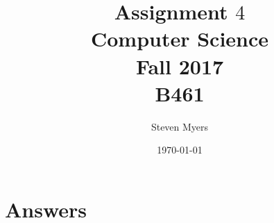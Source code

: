 \documentclass{article}
\begin{document}
\title{Assignment $4$\\ Computer Science \\ Fall 2017\\ B461}         %
\author{Steven Myers}        %
\date{\today}          %
\maketitle

\makeatother     %

\pagestyle{plain}

\section*{Answers}
\end{document}
